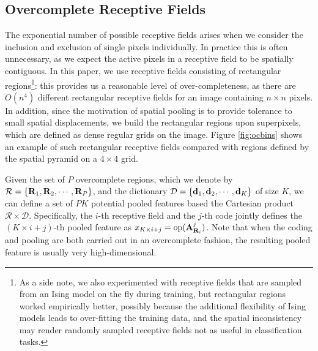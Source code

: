 \subsection{Overcomplete Receptive Fields}
The exponential number of possible receptive fields arises when we consider the inclusion and exclusion of single pixels individually. In practice this is often unnecessary, as we expect the active pixels in a receptive field to be spatially contiguous. In this paper, we use receptive fields consisting of rectangular regions\footnote{As a side note, we also experimented with receptive fields that are sampled from an Ising model on the fly during training, but rectangular regions worked empirically better, possibly because the additional flexibility of Ising models leads to over-fitting the training data, and the spatial inconsistency may render randomly sampled receptive fields not as useful in classification tasks.}: this provides us a reasonable level of over-completeness, as there are $O(n^4)$ different rectangular receptive fields for an image containing $n\times n$ pixels. In addition, since the motivation of spatial pooling is to provide tolerance to small spatial displacements, we build the rectangular regions upon superpixels, which are defined as dense regular grids on the image. Figure \ref{fig:ocbins} shows an example of such rectangular receptive fields compared with regions defined by the spatial pyramid on a $4\times4$ grid.

Given the set of $P$ overcomplete regions, which we denote by $\mathcal{R} = \{\mathbf{R}_{1},\mathbf{R}_{2},\cdots,\mathbf{R}_{P}\}$, and the dictionary $\mathcal{D} = \{\mathbf{d}_1,\mathbf{d}_2,\cdots,\mathbf{d}_K\}$ of size $K$, we can define a set of $PK$ potential pooled features based the Cartesian product $\mathcal{R}\times\mathcal{D}$. Specifically, the $i$-th receptive field and the $j$-th code jointly defines the $(K\times i + j)$-th pooled feature as $x_{K\times i + j} = \operatorname{op} (\mathbf{A}_{\mathbf{R}_i}^{j})$. Note that when the coding and pooling are both carried out in an overcomplete fashion, the resulting pooled feature is usually very high-dimensional.

